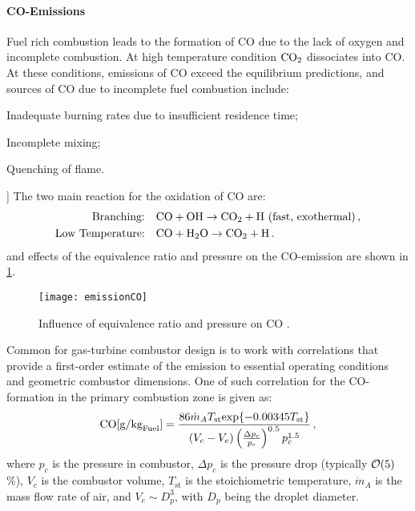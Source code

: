 \paragraph*{\bf CO-Emissions}
Fuel rich combustion leads to the formation of CO due to the lack of oxygen and incomplete combustion. At high temperature condition $\mathrm{CO_2}$ dissociates into CO. At these conditions, emissions of CO exceed the equilibrium predictions, and sources of CO due to incomplete fuel combustion include:
\begin{itemizePacked}
\item Inadequate burning rates due to insufficient residence time;
\item Incomplete mixing;
\item Quenching of flame.
\end{itemizePacked}]
The two main reaction for the oxidation of CO are:
\[
  \begin{split}
  \text{Branching:}& \quad \mathrm{CO} + \mathrm{OH} \rightarrow \mathrm{CO_2} + \mathrm{H} \,\,\text{(fast, exothermal)} \, ,\\
  \text{Low Temperature:}&\quad \mathrm{CO} + \mathrm{H_2O} \rightarrow \mathrm{CO_2} + \mathrm{H} \, .
  \end{split}
\]
and effects of the equivalence ratio and pressure on the CO-emission are shown in \cref{FIG_EMISSION_CO}.

\begin{figure}[!htb!]
 \centering
    {\texttt{[image: emissionCO]}}
    \caption{\label{FIG_EMISSION_CO}Influence of equivalence ratio and pressure on CO \cite{LEFEBVRE_BOOK1999}.}
\end{figure}

Common for gas-turbine combustor design is to work with correlations that provide a first-order estimate of the emission to essential operating conditions and geometric combustor dimensions. One of such correlation for the CO-formation in the primary combustion zone is given as:
\begin{equation}
\label{eqn:CO_corr}
  \mathrm{CO} [\text{g/kg}_\text{Fuel}] = {\frac{86\dot{m}_A T_\text{st} \text{exp}\{-0.00345T_\text{st}\}}{(V_c-V_e) \left({\frac{\Delta p_c}{p_c}}\right)^{0.5} p_c^{1.5}}}\,,
\end{equation}
where $p_c$ is the pressure in combustor, $\Delta p_c$ is the pressure drop (typically ${\cal{O}}(5)$ \%), $V_c$ is the combustor volume, $T_\text{st}$ is the stoichiometric temperature, $\dot{m}_A$ is the mass flow rate of air, and $V_e \sim D_p^3$, with $D_p$ being the droplet diameter.

